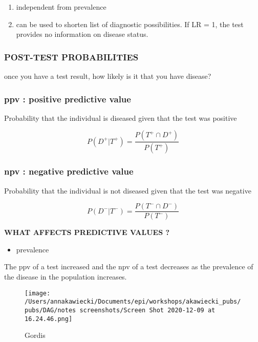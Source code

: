 \documentclass[
]{article}
\providecommand{\tightlist}{%
  \setlength{\itemsep}{0pt}\setlength{\parskip}{0pt}}
\begin{document}
\begin{enumerate}
\def\labelenumi{\arabic{enumi}.}
\item
  independent from prevalence
\item
  can be used to shorten list of diagnostic possibilities. If LR = 1,
  the test provides no information on disease status.
\end{enumerate}

\hypertarget{post-test-probabilities}{%
\subsubsection{POST-TEST PROBABILITIES}\label{post-test-probabilities}}

once you have a test result, how likely is it that you have disease?

\hypertarget{ppv-positive-predictive-value}{%
\subsubsection{ppv : positive predictive
value}\label{ppv-positive-predictive-value}}

Probability that the individual is diseased given that the test was
positive

\[P(D^+|T^+)= \frac{P(T^+ \cap D^+)}{P(T^+)}\]

\hypertarget{npv-negative-predictive-value}{%
\subsubsection{npv : negative predictive
value}\label{npv-negative-predictive-value}}

Probability that the individual is not diseased given that the test was
negative

\[P(D^-|T^-)= \frac{P(T^- \cap D^-)}{P(T^-)}\]

\textbf{WHAT AFFECTS PREDICTIVE VALUES ?}

\begin{itemize}
\tightlist
\item
  prevalence
\end{itemize}

The ppv of a test increased and the npv of a test decreases as the
prevalence of the disease in the population increases.

\begin{figure}
\centering
\texttt{[image: /Users/annakawiecki/Documents/epi/workshops/akawiecki\_pubs/pubs/DAG/notes screenshots/Screen Shot 2020-12-09 at 16.24.46.png]}
\caption{Gordis}
\end{figure}
\end{document}
